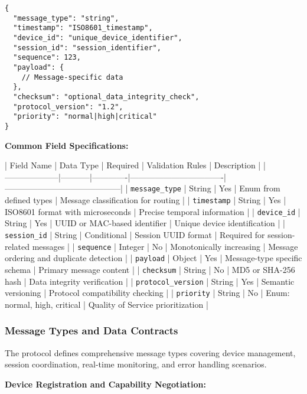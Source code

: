 \documentclass[12pt,a4paper]{article}
\begin{document}
\begin{verbatim}
{
  "message_type": "string",
  "timestamp": "ISO8601_timestamp", 
  "device_id": "unique_device_identifier",
  "session_id": "session_identifier",
  "sequence": 123,
  "payload": {
    // Message-specific data
  },
  "checksum": "optional_data_integrity_check",
  "protocol_version": "1.2",
  "priority": "normal|high|critical"
}
\end{verbatim}

\textbf{Common Field Specifications:}

| Field Name         | Data Type | Required    | Validation Rules                 | Description                              |
|--------------------|-----------|-------------|----------------------------------|------------------------------------------|
| \texttt{message\_type}     | String    | Yes         | Enum from defined types          | Message classification for routing       |
| \texttt{timestamp}        | String    | Yes         | ISO8601 format with microseconds | Precise temporal information             |
| \texttt{device\_id}        | String    | Yes         | UUID or MAC-based identifier     | Unique device identification             |
| \texttt{session\_id}       | String    | Conditional | Session UUID format              | Required for session-related messages    |
| \texttt{sequence}         | Integer   | No          | Monotonically increasing         | Message ordering and duplicate detection |
| \texttt{payload}          | Object    | Yes         | Message-type specific schema     | Primary message content                  |
| \texttt{checksum}         | String    | No          | MD5 or SHA-256 hash              | Data integrity verification              |
| \texttt{protocol\_version} | String    | Yes         | Semantic versioning              | Protocol compatibility checking          |
| \texttt{priority}         | String    | No          | Enum: normal, high, critical     | Quality of Service prioritization        |

\subsubsection{Message Types and Data Contracts}

The protocol defines comprehensive message types covering device management, session coordination, real-time monitoring,
and error handling scenarios.

\textbf{Device Registration and Capability Negotiation:}
\end{document}
